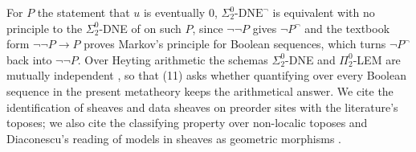 \documentclass{lmcs}
\theoremstyle{definition}
\theoremstyle{remark}
\newcommand{\prin}[1]{\mathrm{#1}}
\providecommand{\SDNE}{\Sigma^0_2\text{-}\prin{DNE}^{\neg}}
\providecommand{\SDNE}{\Sigma^0_2\text{-}\prin{DNE}^{\neg}}
\begin{document}
For $P$ the statement that $u$ is eventually $0$, $\SDNE$ is equivalent with no principle to the
$\Sigma^0_2$-DNE of \cite{ABHK04} on such $P$, since $\neg\neg P$ gives $\neg P^{\neg}$ and the textbook form
$\neg\neg P\to P$ proves Markov's principle for Boolean sequences, which turns $\neg P^{\neg}$ back into
$\neg\neg P$. Over Heyting arithmetic the
schemas $\Sigma^0_2$-DNE and $\Pi^0_2$-LEM are mutually independent \cite[Theorem~3.1 and
p.~6]{ABHK04}, so that (11)
asks whether quantifying over every Boolean sequence in the present metatheory keeps the arithmetical answer. We cite the
identification of sheaves and data sheaves on preorder sites with the literature's toposes; we also cite the classifying property over non-localic toposes and Diaconescu's reading of models in sheaves as
geometric morphisms
\cite{Diaconescu75,CL25a}.


\end{document}

